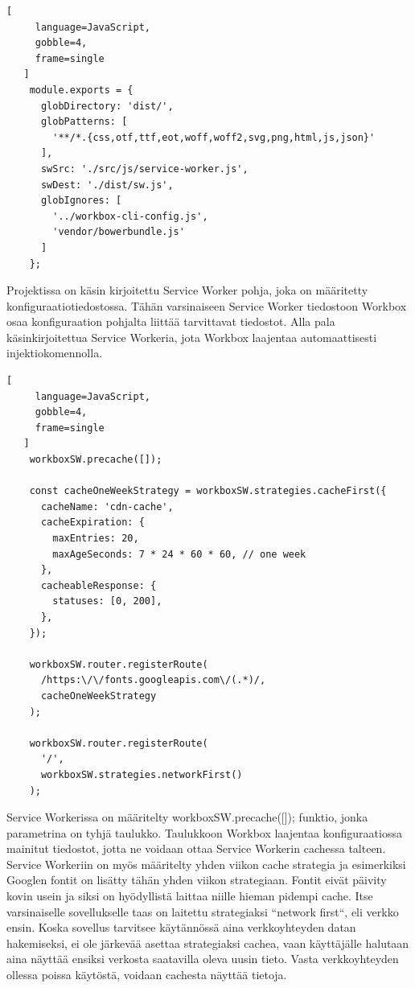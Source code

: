 \documentclass{tktltiki}
\begin{document}
\begin{lstlisting}[
     language=JavaScript,
     gobble=4,
     frame=single
   ]
    module.exports = {
      globDirectory: 'dist/',
      globPatterns: [
        '**/*.{css,otf,ttf,eot,woff,woff2,svg,png,html,js,json}'
      ],
      swSrc: './src/js/service-worker.js',
      swDest: './dist/sw.js',
      globIgnores: [
        '../workbox-cli-config.js',
        'vendor/bowerbundle.js'
      ]
    };
\end{lstlisting}


Projektissa on käsin kirjoitettu Service Worker pohja, joka on määritetty konfiguraatiotiedostossa. Tähän varsinaiseen Service Worker tiedostoon Workbox osaa konfiguraation pohjalta liittää tarvittavat tiedostot. Alla pala käsinkirjoitettua Service Workeria, jota Workbox laajentaa automaattisesti injektiokomennolla.

\begin{lstlisting}[
     language=JavaScript,
     gobble=4,
     frame=single
   ]
    workboxSW.precache([]);
    
    const cacheOneWeekStrategy = workboxSW.strategies.cacheFirst({
      cacheName: 'cdn-cache',
      cacheExpiration: {
        maxEntries: 20,
        maxAgeSeconds: 7 * 24 * 60 * 60, // one week
      },
      cacheableResponse: {
        statuses: [0, 200],
      },
    });
    
    workboxSW.router.registerRoute(
      /https:\/\/fonts.googleapis.com\/(.*)/,
      cacheOneWeekStrategy
    );
    
    workboxSW.router.registerRoute(
      '/',
      workboxSW.strategies.networkFirst()
    );
\end{lstlisting}

Service Workerissa on määritelty workboxSW.precache([]); funktio, jonka parametrina on tyhjä taulukko. Taulukkoon Workbox laajentaa konfiguraatiossa mainitut tiedostot, jotta ne voidaan ottaa Service Workerin cachessa talteen. Service Workeriin on myös määritelty yhden viikon cache strategia ja esimerkiksi Googlen fontit on lisätty tähän yhden viikon strategiaan. Fontit eivät päivity kovin usein ja siksi on hyödyllistä laittaa niille hieman pidempi cache. Itse varsinaiselle sovellukselle taas on laitettu strategiaksi “network first“, eli verkko ensin. Koska sovellus tarvitsee käytännössä aina verkkoyhteyden datan hakemiseksi, ei ole järkevää asettaa strategiaksi cachea, vaan käyttäjälle halutaan aina näyttää ensiksi verkosta saatavilla oleva uusin tieto. Vasta verkkoyhteyden ollessa poissa käytöstä, voidaan cachesta näyttää tietoja. 
\end{document}
